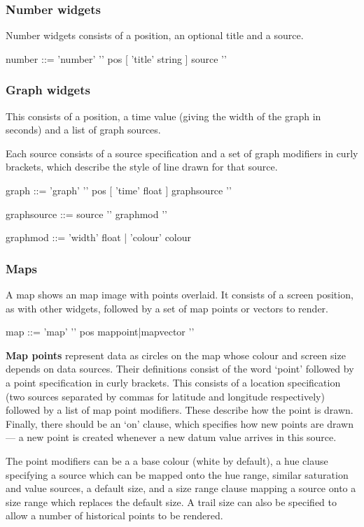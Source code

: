 \subsubsection{Number widgets}
Number widgets consists of a position, an optional title and
a source.
\begin{v}
number      ::= 'number' '{' pos [ 'title' string ] source '}'
\end{v}

\subsubsection{Graph widgets}
This consists of a position, a time value (giving
the width of the graph in seconds) and a list of graph
sources.

Each source consists of a source specification and a set
of graph modifiers in curly brackets, which describe the
style of line drawn for that source.

\begin{v}
graph       ::= 'graph' '{' pos [ 'time' float ] { graphsource } '}'

graphsource ::= source '{' { graphmod } '}'

graphmod    ::= 'width' float 
            |   'colour' colour
\end{v}

\subsubsection{Maps}
A map shows an map image with points overlaid. It consists
of a screen position, as with other widgets,
followed by a set of map points or vectors to render.

\begin{v}
map         ::= 'map' '{' pos { mappoint|mapvector } '}'
\end{v}

\textbf{Map points} represent data as circles on the map
whose colour and screen size depends on data sources.
Their definitions consist of the word `point' followed
by a point specification in curly brackets.
This consists of a location specification
(two sources separated by commas for latitude and longitude
respectively) followed by a list of map point modifiers.
These describe how the point is drawn. Finally, there should
be an `on' clause, which specifies how new points are drawn ---
a new point is created whenever a new datum value
arrives in this source.

The point modifiers can be a a base colour (white by default),
a hue clause specifying a source which can be mapped onto the 
hue range, similar saturation and value sources, a default
size, and a size range clause mapping a source onto a size range
which replaces the default size. A trail size can also be specified
to allow a number of historical points to be rendered.

